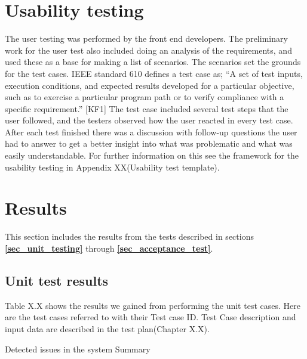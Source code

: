 {{\section{Usability testing}

The user testing was performed by the front end developers. The preliminary work for the user test also included doing an analysis of the requirements, and used these as a base for making a list of scenarios. The scenarios set the grounds for the test cases. IEEE standard 610 defines a test case as; “A set of test inputs, execution conditions, and expected results developed for a particular objective, such as to exercise a particular program path or to verify compliance with a specific requirement.” [KF1] 
The test case included several test steps that the user followed, and the testers observed how the user reacted in every test case. After each test finished there was a discussion with follow-up questions the user had to answer to get a better insight into what was problematic and what was easily understandable. For further information on this see the framework for the usability testing in Appendix XX(Usability test template).

\section{Results}
\label{sec_test_results}

This section includes the results from the tests described in sections \textbf{\ref{sec_unit_testing}} through \textbf{\ref{sec_acceptance_test}}.

\subsection{Unit test results}

Table X.X shows the results we gained from performing the unit test cases. Here are the test cases referred to with their Test case ID. Test Case description and input data are described in the test plan(Chapter X.X).\newline

Detected issues in the system\newline 
Summary \newline 

}}
